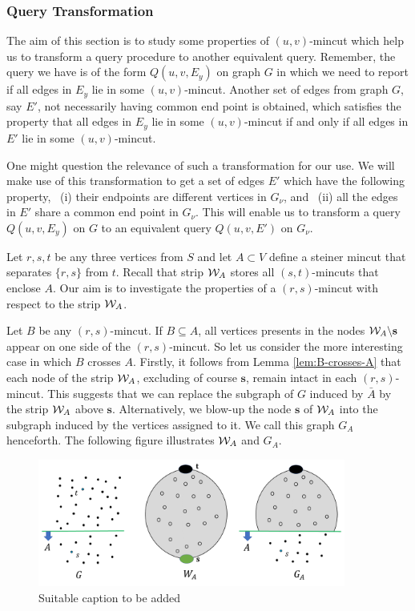 \subsubsection{Query Transformation}
The aim of this section is to study some properties of $(u,v)$-mincut which help us to transform a query procedure to another equivalent query. Remember, the query we have is of the form $Q(u,v,E_y)$ on graph $G$ in which we need to report if all edges in $E_y$ lie in some $(u,v)$-mincut. Another set of edges from graph $G$, say $E'$, not necessarily having common end point is obtained, which satisfies the property that all edges in $E_y$ lie in some $(u,v)$-mincut if and only if all edges in $E'$ lie in some $(u,v)$-mincut.

One might question the relevance of such a transformation for our use. We will make use of this transformation to get a set of edges $E'$ which have the following property,
~(i) their endpoints are different vertices in $G_\nu$, and
~(ii) all the edges in $E'$ share a common end point in $G_\nu$. This will enable us to transform a query $Q(u,v,E_y)$ on $G$ to an equivalent query $Q(u,v,E')$ on $G_\nu$.



Let $r,s,t$ be any three vertices from $S$
and let $A\subset V$ define a steiner mincut that separates $\{r,s\}$ from $t$. Recall that strip ${\cal W}_A$ stores all $(s,t)$-mincuts that enclose $A$. Our aim is to investigate the properties of a $(r,s)$-mincut with respect to the strip ${\cal W}_A$.

Let $B$ be any $(r,s)$-mincut. If $B\subseteq A$, all vertices presents in the nodes ${\cal W}_A\backslash {\mathbf{s}}$ appear on one side of the $(r,s)$-mincut. So let us consider the more interesting case in which $B$ crosses $A$. Firstly, it follows from Lemma \ref{lem:B-crosses-A} that each node of the strip ${\cal W}_A$, excluding of course $\mathbf{s}$, remain intact in each $(r,s)$-mincut. This suggests that we can replace the subgraph of $G$ induced by $\bar{A}$ by the strip ${\cal W}_A$ above ${\mathbf{s}}$. Alternatively, we blow-up the node $\mathbf{s}$ of ${\cal W}_A$ into the subgraph induced by the vertices assigned to it. We call this graph $G_A$ henceforth. The following figure illustrates ${\cal W}_A$ and $G_A$.

\begin{figure}[h]
    \centering
    \includegraphics[width=0.9\textwidth]{src/images/G_A.png}{}
    \caption{Suitable caption to be added}
    \label{fig:G_A}
\end{figure}

